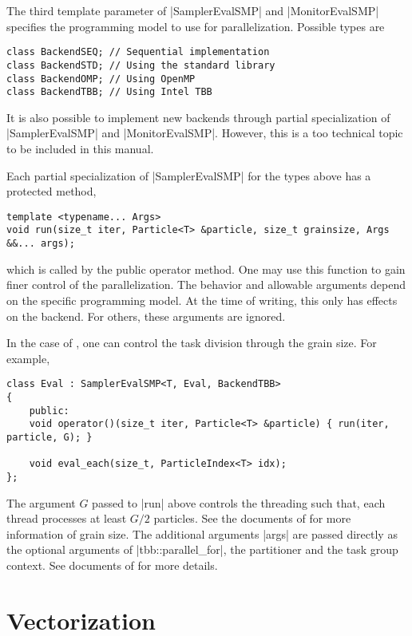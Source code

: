 The third template parameter of |SamplerEvalSMP| and |MonitorEvalSMP| specifies
the programming model to use for parallelization. Possible types are
\begin{verbatim}
class BackendSEQ; // Sequential implementation
class BackendSTD; // Using the standard library
class BackendOMP; // Using OpenMP
class BackendTBB; // Using Intel TBB
\end{verbatim}
It is also possible to implement new backends through partial specialization of
|SamplerEvalSMP| and |MonitorEvalSMP|. However, this is a too technical topic
to be included in this manual.

Each partial specialization of |SamplerEvalSMP| for the types above has a
protected method,
\begin{verbatim}
template <typename... Args>
void run(size_t iter, Particle<T> &particle, size_t grainsize, Args &&... args);
\end{verbatim}
which is called by the public operator method. One may use this function to
gain finer control of the parallelization. The behavior and allowable arguments
depend on the specific programming model. At the time of writing, this only has
effects on the \tbb backend. For others, these arguments are ignored.

In the case of \tbb, one can control the task division through the grain size.
For example,
\begin{verbatim}
class Eval : SamplerEvalSMP<T, Eval, BackendTBB>
{
    public:
    void operator()(size_t iter, Particle<T> &particle) { run(iter, particle, G); }

    void eval_each(size_t, ParticleIndex<T> idx);
};
\end{verbatim}
The argument $G$ passed to |run| above controls the threading such that, each
thread processes at least $G / 2$ particles. See the documents of \tbb for more
information of grain size. The additional arguments |args| are passed directly
as the optional arguments of |tbb::parallel_for|, the partitioner and the task
group context. See documents of \tbb for more details.

\section{Vectorization}
\label{sec:Vectorization}

